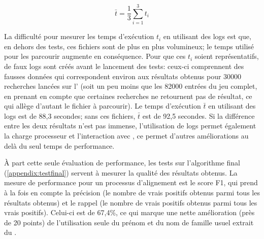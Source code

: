 \begin{displaymath}
	\bar{t} = \frac{1}{3}\sum_{i=1}^{3}t_i
\end{displaymath}

La difficulté pour mesurer les temps d'exécution \(t_i\) en utilisant des \glspl{log} est que, en dehors des tests, ces fichiers sont de plus en plus volumineux; le temps utilisé pour les parcourir augmente en conséquence. Pour que ces \(t_i\) soient représentatifs, de faux \glspl{log} sont créés avant le lancement des tests: ceux-ci comprennent des fausses données qui correspondent environ aux résultats obtenus pour 30000 recherches lancées sur l'\api{} (soit un peu moins que les 82000 entrées du jeu complet, en prenant en compte que certaines recherches ne retournent pas de résultat, ce qui allège d'autant le fichier à parcourir). Le temps d'exécution \(\bar{t}\) en utilisant des \glspl{log} est de 88,3 secondes; sans ces fichiers, \(\bar{t}\) est de 92,5 secondes. Si la différence entre les deux résultats n'est pas immense, l'utilisation de \glspl{log} permet également la charge processeur et l'interaction avec \wkd{}, ce permet d'autres améliorations au delà du seul temps de performance.

À part cette seule évaluation de performance, les tests sur l'algorithme final (\ref{appendix:testfinal}) servent à mesurer la qualité des résultats obtenus. La mesure de performance pour un processus d'alignement est le \gls{score F1}, qui prend à la fois en compte la précision (le nombre de vrais positifs obtenus parmi tous les résultats obtenus) et le rappel (le nombre de vrais positifs obtenus parmi tous les vrais positifs). Celui-ci est de 67,4\%, ce qui marque une nette amélioration (près de 20 points) de l'utilisation seule du prénom et du nom de famille usuel extrait du \tname{}. 

